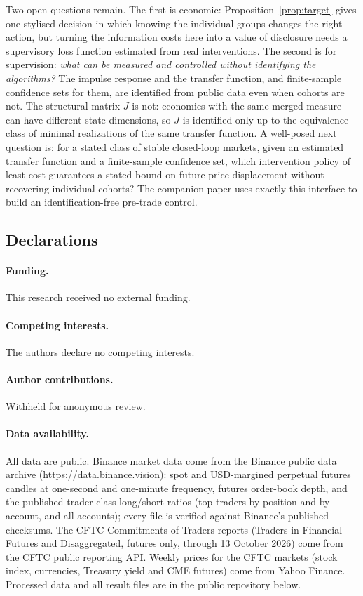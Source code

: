 \documentclass[12pt]{article}
\theoremstyle{definition}
\theoremstyle{remark}
\begin{document}
Two open questions remain. The first is economic: Proposition~\ref{prop:target} gives one stylised decision in which knowing the individual groups changes the right action, but turning the information costs here into a value of disclosure needs a supervisory loss function estimated from real interventions. The second is for supervision: \emph{what can be measured and controlled without identifying the algorithms?} The impulse response and the transfer function, and finite-sample confidence sets for them, are identified from public data even when cohorts are not. The structural matrix $J$ is not: economies with the same merged measure can have different state dimensions, so $J$ is identified only up to the equivalence class of minimal realizations of the same transfer function. A well-posed next question is: for a stated class of stable closed-loop markets, given an estimated transfer function and a finite-sample confidence set, which intervention policy of least cost guarantees a stated bound on future price displacement without recovering individual cohorts? The companion paper uses exactly this interface to build an identification-free pre-trade control.

\subsection*{Declarations}

\paragraph{Funding.} This research received no external funding.

\paragraph{Competing interests.} The authors declare no competing interests.

\paragraph{Author contributions.} Withheld for anonymous review.

\paragraph{Data availability.} All data are public. Binance market data come from the Binance public data archive (\url{https://data.binance.vision}): spot and USD-margined perpetual futures candles at one-second and one-minute frequency, futures order-book depth, and the published trader-class long/short ratios (top traders by position and by account, and all accounts); every file is verified against Binance's published checksums. The CFTC Commitments of Traders reports (Traders in Financial Futures and Disaggregated, futures only, through 13 October 2026) come from the CFTC public reporting API. Weekly prices for the CFTC markets (stock index, currencies, Treasury yield and CME futures) come from Yahoo Finance. Processed data and all result files are in the public repository below.
\end{document}
